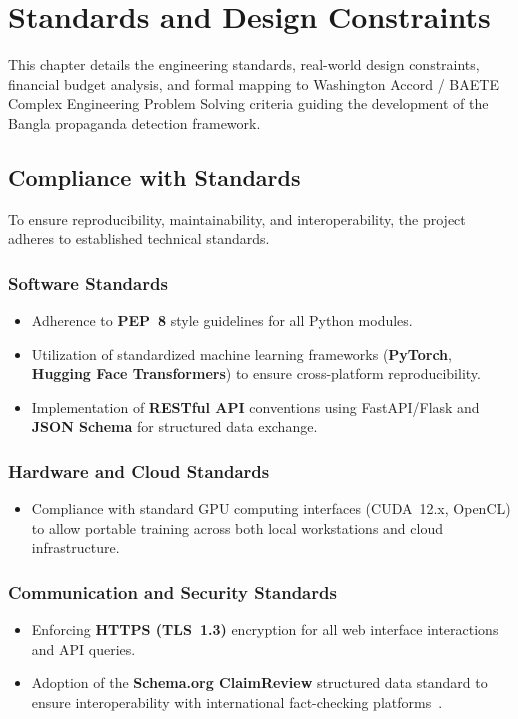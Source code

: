 \documentclass[12pt,a4paper]{report}
\begin{document}
\chapter{Standards and Design Constraints}
\label{ch:standards}

This chapter details the engineering standards, real-world design constraints,
financial budget analysis, and formal mapping to Washington Accord / BAETE Complex
Engineering Problem Solving criteria guiding the development of the Bangla
propaganda detection framework.

\section{Compliance with Standards}
To ensure reproducibility, maintainability, and interoperability, the project
adheres to established technical standards.

\subsection{Software Standards}
\begin{itemize}
  \item Adherence to \textbf{PEP~8} style guidelines for all Python modules.
  \item Utilization of standardized machine learning frameworks (\textbf{PyTorch},
        \textbf{Hugging Face Transformers}) to ensure cross-platform
        reproducibility.
  \item Implementation of \textbf{RESTful API} conventions using FastAPI/Flask and
        \textbf{JSON Schema} for structured data exchange.
\end{itemize}

\subsection{Hardware and Cloud Standards}
\begin{itemize}
  \item Compliance with standard GPU computing interfaces (CUDA~12.x, OpenCL) to
        allow portable training across both local workstations and cloud
        infrastructure.
\end{itemize}

\subsection{Communication and Security Standards}
\begin{itemize}
  \item Enforcing \textbf{HTTPS (TLS~1.3)} encryption for all web interface
        interactions and API queries.
  \item Adoption of the \textbf{Schema.org ClaimReview} structured data standard to
        ensure interoperability with international fact-checking
        platforms~\cite{google_claimreview}.
\end{itemize}
\end{document}
